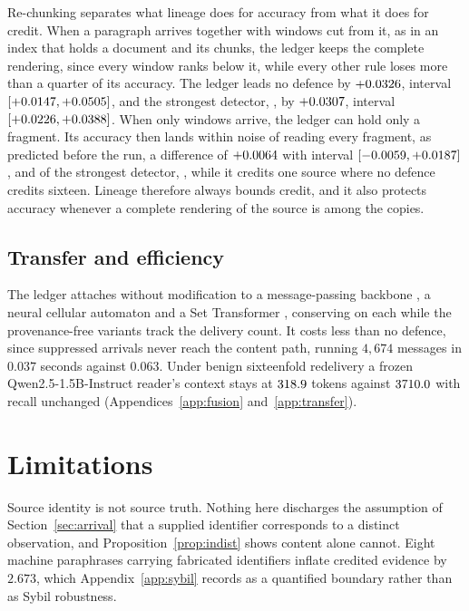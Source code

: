 \documentclass{article}
\begin{document}
Re-chunking separates what lineage does for accuracy from what it does for
credit. When a paragraph arrives together with windows cut from it, as in an
index that holds a document and its chunks, the ledger keeps the complete
rendering, since every window ranks below it, while every other rule loses more
than a quarter of its accuracy. The ledger leads no defence by
$+0.0326$, interval $[+0.0147, +0.0505]$, and the strongest detector,
\LmRechunkBestDetector, by $+0.0307$, interval
$[+0.0226, +0.0388]$. When only windows arrive, the ledger can hold only a
fragment. Its accuracy then lands within noise of reading every fragment, as
predicted before the run, a difference of $+0.0064$ with interval
$[-0.0059, +0.0187]$, and of the strongest detector, \LmFragBestDetector, while it
credits one source where no defence credits sixteen. Lineage therefore always
bounds credit, and it also protects accuracy whenever a complete rendering of
the source is among the copies.

\subsection{Transfer and efficiency}
\label{sec:transfer}

The ledger attaches without modification to a message-passing backbone
\citep{gilmer2017mpnn}, a neural cellular automaton
\citep{mordvintsev2020growing} and a Set Transformer
\citep{lee2019settransformer}, conserving on each while the provenance-free
variants track the delivery count. It costs less than no defence, since
suppressed arrivals never reach the content path, running $4{,}674$ messages in
$0.037$ seconds against $0.063$. Under benign sixteenfold redelivery a frozen
Qwen2.5-1.5B-Instruct reader's context stays at $318.9$
tokens against $3710.0$ with recall unchanged
(Appendices~\ref{app:fusion} and~\ref{app:transfer}).


\section{Limitations}
\label{sec:limits}

Source identity is not source truth. Nothing here discharges the assumption of
Section~\ref{sec:arrival} that a supplied identifier corresponds to a distinct
observation, and Proposition~\ref{prop:indist} shows content alone cannot. Eight
machine paraphrases carrying fabricated identifiers inflate credited evidence by
$2.673$, which Appendix~\ref{app:sybil} records as a quantified boundary rather
than as Sybil robustness.
\end{document}
